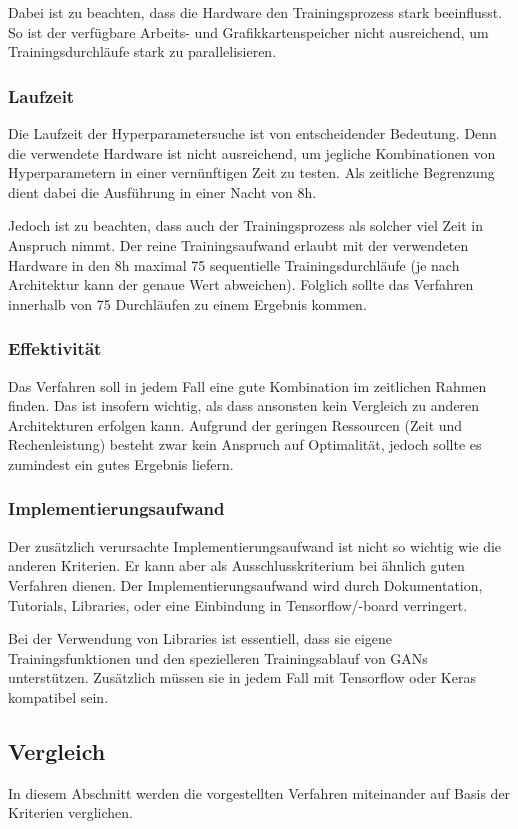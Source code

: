 Dabei ist zu beachten, dass die Hardware den Trainingsprozess stark beeinflusst.
So ist der verfügbare Arbeits- und Grafikkartenspeicher nicht ausreichend, um Trainingsdurchläufe stark zu parallelisieren.

\subsubsection{Laufzeit}
Die Laufzeit der Hyperparametersuche ist von entscheidender Bedeutung.
Denn die verwendete Hardware ist nicht ausreichend, um jegliche Kombinationen von Hyperparametern in einer vernünftigen Zeit zu testen.
Als zeitliche Begrenzung dient dabei die Ausführung in einer Nacht von 8h.

Jedoch ist zu beachten, dass auch der Trainingsprozess als solcher viel Zeit in Anspruch nimmt.
Der reine Trainingsaufwand erlaubt mit der verwendeten Hardware in den 8h maximal 75 sequentielle Trainingsdurchläufe (je nach Architektur kann der genaue Wert abweichen).
Folglich sollte das Verfahren innerhalb von 75 Durchläufen zu einem Ergebnis kommen.

\subsubsection{Effektivität}
Das Verfahren soll in jedem Fall eine gute Kombination im zeitlichen Rahmen finden.
Das ist insofern wichtig, als dass ansonsten kein Vergleich zu anderen Architekturen erfolgen kann.
Aufgrund der geringen Ressourcen (Zeit und Rechenleistung) besteht zwar kein Anspruch auf Optimalität, jedoch sollte es zumindest ein gutes Ergebnis liefern.

\subsubsection{Implementierungsaufwand}
Der zusätzlich verursachte Implementierungsaufwand ist nicht so wichtig wie die anderen Kriterien.
Er kann aber als Ausschlusskriterium bei ähnlich guten Verfahren dienen.
Der Implementierungsaufwand wird durch Dokumentation, Tutorials, Libraries, oder eine Einbindung in Tensorflow/-board verringert.

Bei der Verwendung von Libraries ist essentiell, dass sie eigene Trainingsfunktionen und den spezielleren Trainingsablauf von GANs unterstützen.
Zusätzlich müssen sie in jedem Fall mit Tensorflow oder Keras kompatibel sein.

\subsection{Vergleich}
In diesem Abschnitt werden die vorgestellten Verfahren miteinander auf Basis der Kriterien verglichen.

